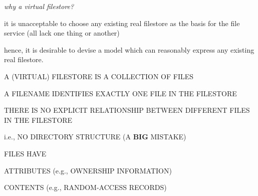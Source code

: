 

\begin{note}\em
why a virtual filestore?

it is unacceptable to choose any existing real filestore as the basis
for the file service (all lack one thing or another)

hence, it is desirable to devise a model which can reasonably express any
existing real filestore.
\end{note}


\begin{bwslide}
\bf

\begin{nrtc}
\item	A (VIRTUAL) FILESTORE IS A COLLECTION OF FILES

\item	A FILENAME IDENTIFIES EXACTLY ONE FILE IN THE FILESTORE

\item	THERE IS NO EXPLICIT RELATIONSHIP BETWEEN DIFFERENT FILES IN THE
	FILESTORE
    \begin{nrtc}
    \item	i.e., NO DIRECTORY STRUCTURE (A {\bf BIG} MISTAKE)
    \end{nrtc}

\item	FILES HAVE
    \begin{nrtc}
    \item	ATTRIBUTES (e.g., OWNERSHIP INFORMATION)

    \item	CONTENTS (e.g., RANDOM-ACCESS RECORDS)
    \end{nrtc}
\end{nrtc}
\end{bwslide}


